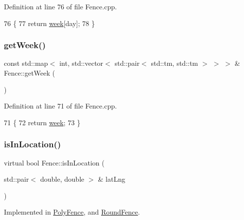 Definition at line 76 of file Fence.\+cpp.


\begin{DoxyCode}
76                                                                      \{
77     \textcolor{keywordflow}{return} \hyperlink{class_fence_ae589e973fa03316847aeceedd72e2b64}{week}[day];
78 \}
\end{DoxyCode}
\mbox{\label{class_fence_a533d7eaba8b2d6774ec2c9dce05145eb}} 
\subsubsection{\texorpdfstring{get\+Week()}{getWeek()}}
{\footnotesize\ttfamily const std\+::map$<$ int, std\+::vector$<$ std\+::pair$<$ std\+::tm, std\+::tm $>$ $>$ $>$ \& Fence\+::get\+Week (\begin{DoxyParamCaption}{ }\end{DoxyParamCaption})}



Definition at line 71 of file Fence.\+cpp.


\begin{DoxyCode}
71                                                                     \{
72     \textcolor{keywordflow}{return} \hyperlink{class_fence_ae589e973fa03316847aeceedd72e2b64}{week};
73 \}
\end{DoxyCode}
\mbox{\label{class_fence_a80fb7fbb60592d3e8afc0ecb5122b987}} 
\subsubsection{\texorpdfstring{is\+In\+Location()}{isInLocation()}}
{\footnotesize\ttfamily virtual bool Fence\+::is\+In\+Location (\begin{DoxyParamCaption}\item[{std\+::pair$<$ double, double $>$ \&}]{lat\+Lng }\end{DoxyParamCaption})\hspace{0.3cm}{\ttfamily [pure virtual]}}



Implemented in \hyperlink{class_poly_fence_af8116af5be86f8426102985c3dbcdf5e}{Poly\+Fence}, and \hyperlink{class_round_fence_a4955bf0dbd168853ba9913465953865d}{Round\+Fence}.

